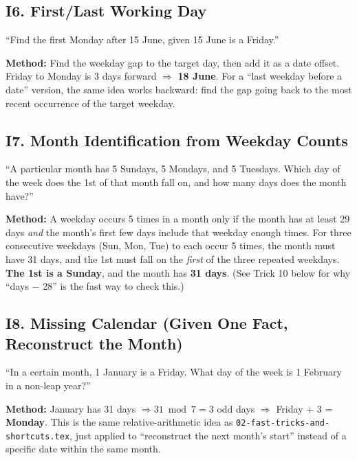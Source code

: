 \documentclass[11pt]{article}
\begin{document}
\subsection*{I6. First/Last Working Day}
\begin{tipbox}[Phrasing]
``Find the first Monday after 15 June, given 15 June is a Friday.''
\end{tipbox}
\textbf{Method:} Find the weekday gap to the target day, then add it as a date offset. Friday to
Monday is $3$ days forward $\Rightarrow$ \textbf{18 June}. For a ``last weekday before a date''
version, the same idea works backward: find the gap going back to the most recent occurrence of the
target weekday.

\subsection*{I7. Month Identification from Weekday Counts}
\begin{tipbox}[Phrasing]
``A particular month has 5 Sundays, 5 Mondays, and 5 Tuesdays. Which day of the week does the 1st of
that month fall on, and how many days does the month have?''
\end{tipbox}
\textbf{Method:} A weekday occurs 5 times in a month only if the month has at least 29 days \emph{and}
the month's first few days include that weekday enough times. For three consecutive weekdays (Sun,
Mon, Tue) to each occur 5 times, the month must have 31 days, and the 1st must fall on the
\emph{first} of the three repeated weekdays. \textbf{The 1st is a Sunday}, and the month has
\textbf{31 days}. (See Trick 10 below for why ``days $-$ 28'' is the fast way to check this.)

\subsection*{I8. Missing Calendar (Given One Fact, Reconstruct the Month)}
\begin{tipbox}[Phrasing]
``In a certain month, 1 January is a Friday. What day of the week is 1 February in a non-leap year?''
\end{tipbox}
\textbf{Method:} January has 31 days $\Rightarrow 31 \bmod 7=3$ odd days $\Rightarrow$ Friday + 3 =
\textbf{Monday}. This is the same relative-arithmetic idea as
\texttt{02-fast-tricks-and-shortcuts.tex}, just applied to ``reconstruct the next month's start''
instead of a specific date within the same month.
\end{document}
